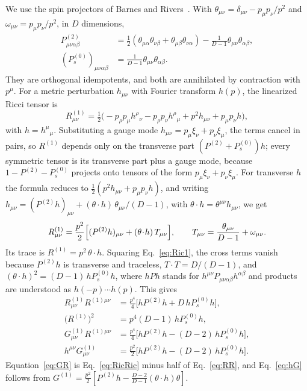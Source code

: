 \documentclass[aps,prd,10pt,twocolumn,superscriptaddress,nofootinbib,floatfix,longbibliography]{revtex4-2}
\newcommand{\Pt}{P^{(2)}}
\newcommand{\Ps}{P^{(0)}_{s}}
\begin{document}
We use the spin projectors of Barnes and Rivers~\cite{Rivers1964,VanNieuwenhuizen1973}. With $\theta_{\mu\nu}=\delta_{\mu\nu}-p_\mu p_\nu/p^2$ and $\omega_{\mu\nu}=p_\mu p_\nu/p^2$, in $D$ dimensions,
\begin{align*}
\Pt_{\mu\nu\alpha\beta}&=\tfrac12(\theta_{\mu\alpha}\theta_{\nu\beta}+\theta_{\mu\beta}\theta_{\nu\alpha})-\tfrac1{D-1}\theta_{\mu\nu}\theta_{\alpha\beta},\\
(\Ps)_{\mu\nu\alpha\beta}&=\tfrac1{D-1}\theta_{\mu\nu}\theta_{\alpha\beta}.
\end{align*}
They are orthogonal idempotents, and both are annihilated by contraction with $p^\mu$. For a metric perturbation $h_{\mu\nu}$ with Fourier transform $h(p)$, the linearized Ricci tensor is
\[
R^{(1)}_{\mu\nu}=\tfrac12\bigl(-p_\rho p_\mu h^\rho{}_\nu-p_\rho p_\nu h^\rho{}_\mu+p^2h_{\mu\nu}+p_\mu p_\nu h\bigr),
\]
with $h=h^\mu{}_\mu$. Substituting a gauge mode $h_{\mu\nu}=p_\mu\xi_\nu+p_\nu\xi_\mu$, the terms cancel in pairs, so $R^{(1)}$ depends only on the transverse part $(\Pt+\Ps)h$; every symmetric tensor is its transverse part plus a gauge mode, because $1-\Pt-\Ps$ projects onto tensors of the form $p_\mu\xi_\nu+p_\nu\xi_\mu$. For transverse $h$ the formula reduces to $\frac12(p^2h_{\mu\nu}+p_\mu p_\nu h)$, and writing $h_{\mu\nu}=(\Pt h)_{\mu\nu}+(\theta\cdot h)\,\theta_{\mu\nu}/(D-1)$, with $\theta\cdot h=\theta^{\mu\nu}h_{\mu\nu}$, we get
\begin{equation}
\label{eq:Ric1}
R^{(1)}_{\mu\nu}=\frac{p^2}2\Bigl[(\Pt h)_{\mu\nu}+(\theta\!\cdot\!h)\,T_{\mu\nu}\Bigr],\qquad T_{\mu\nu}=\frac{\theta_{\mu\nu}}{D-1}+\omega_{\mu\nu}.
\end{equation}
Its trace is $R^{(1)}=p^2\,\theta\cdot h$. Squaring Eq.~\eqref{eq:Ric1}, the cross terms vanish because $\Pt h$ is transverse and traceless, $T\cdot T=D/(D-1)$, and $(\theta\cdot h)^2=(D-1)\,h\Ps h$, where $hPh$ stands for $h^{\mu\nu}P_{\mu\nu\alpha\beta}h^{\alpha\beta}$ and products are understood as $h(-p)\cdots h(p)$. This gives
\begin{align}
R^{(1)}_{\mu\nu}R^{(1)\mu\nu}&=\tfrac{p^4}4\bigl[h\Pt h+D\,h\Ps h\bigr],\label{eq:RicRic}\\
\bigl(R^{(1)}\bigr)^2&=p^4(D-1)\,h\Ps h,\label{eq:RR}\\
G^{(1)}_{\mu\nu}R^{(1)\mu\nu}&=\tfrac{p^4}4\bigl[h\Pt h-(D-2)\,h\Ps h\bigr],\label{eq:GR}\\
h^{\mu\nu}G^{(1)}_{\mu\nu}&=\tfrac{p^2}2\bigl[h\Pt h-(D-2)\,h\Ps h\bigr].\label{eq:hG}
\end{align}
Equation~\eqref{eq:GR} is Eq.~\eqref{eq:RicRic} minus half of Eq.~\eqref{eq:RR}, and Eq.~\eqref{eq:hG} follows from $G^{(1)}=\frac{p^2}2[\Pt h-\frac{D-2}{D-1}(\theta\cdot h)\theta]$.
\end{document}
